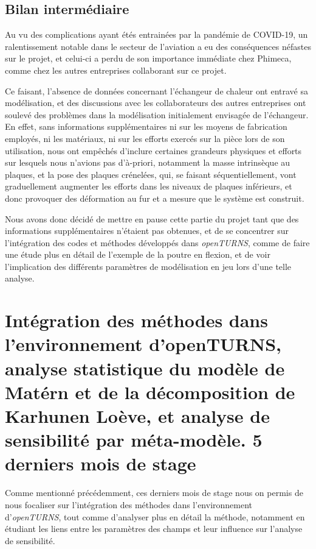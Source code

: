 \documentclass[a4paper,10pt]{article}
\begin{document}
\subsection{Bilan intermédiaire}

Au vu des complications ayant étés entrainées par la pandémie de COVID-19, un ralentissement notable dans le secteur de l'aviation a eu des conséquences néfastes sur le projet, et celui-ci a perdu de son importance immédiate chez Phimeca, comme chez les autres entreprises collaborant sur ce projet. \par \smallskip

Ce faisant, l'absence de données concernant l'échangeur de chaleur ont entravé sa modélisation, et des discussions avec les collaborateurs des autres entreprises ont soulevé des problèmes dans la modélisation initialement envisagée de l'échangeur. En effet, sans informations supplémentaires ni sur les moyens de fabrication employés, ni les matériaux, ni sur les efforts exercés sur la pièce lors de son utilisation, nous ont empêchés d'inclure certaines grandeurs physiques et efforts sur lesquels nous n'avions pas d'à-priori, notamment la masse intrinsèque au plaques, et la pose des plaques crénelées, qui, se faisant séquentiellement, vont graduellement augmenter les efforts dans les niveaux de plaques inférieurs, et donc provoquer des déformation au fur et a mesure que le système est construit. \par \smallskip

Nous avons donc décidé de mettre en pause cette partie du projet tant que des informations supplémentaires n'étaient pas obtenues, et de se concentrer sur l'intégration des codes et méthodes développés dans \textit{openTURNS}, comme de faire une étude plus en détail de l’exemple de la poutre en flexion, et de voir l'implication des différents paramètres de modélisation en jeu lors d'une telle analyse. \newpage

\section{Intégration des méthodes dans l'environnement d'openTURNS, analyse statistique du modèle de Matérn et de la décomposition de Karhunen Loève, et analyse de sensibilité par méta-modèle. 5 derniers mois de stage}
Comme mentionné précédemment, ces derniers mois de stage nous on permis de nous focaliser sur l'intégration des méthodes dans l'environnement d'\textit{openTURNS}, tout comme d'analyser plus en détail la méthode, notamment en étudiant les liens entre les paramètres des champs et leur influence sur l'analyse de sensibilité.
\end{document}
